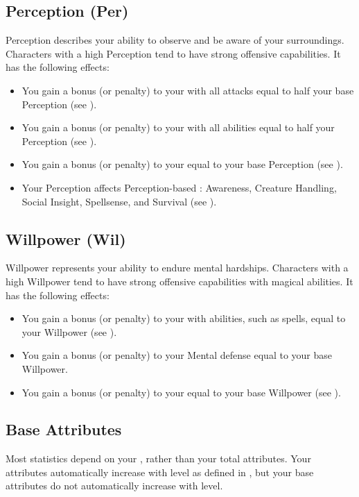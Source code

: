     \subsection{Perception (Per)}\label{Perception}
        {
            Perception describes your ability to observe and be aware of your surroundings.
            Characters with a high Perception tend to have strong offensive capabilities.
            It has the following effects:
            \begin{itemize}
                \item You gain a bonus (or penalty) to your  with all attacks equal to half your base Perception (see ).
                \item You gain a bonus (or penalty) to your  with all abilities equal to half your Perception (see ).
                \item You gain a bonus (or penalty) to your  equal to your base Perception (see ).
                \item Your Perception affects Perception-based : Awareness, Creature Handling, Social Insight, Spellsense, and Survival (see ).
            \end{itemize}
        }

    \subsection{Willpower (Wil)}\label{Willpower}
        {
            Willpower represents your ability to endure mental hardships.
            Characters with a high Willpower tend to have strong offensive capabilities with magical abilities.
            It has the following effects:
            \begin{itemize}
                \item You gain a bonus (or penalty) to your  with  abilities, such as spells, equal to your Willpower (see ).
                \item You gain a bonus (or penalty) to your Mental defense equal to your base Willpower.
                \item You gain a bonus (or penalty) to your  equal to your base Willpower (see ).
            \end{itemize}
        }

    \subsection{Base Attributes}\label{Base Attributes}
        Most statistics depend on your , rather than your total attributes.
        Your attributes automatically increase with level as defined in , but your base attributes do not automatically increase with level.

